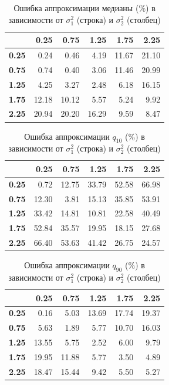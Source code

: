 \documentclass[12pt]{article}
\begin{document}
	\begin{table}[!hhh]
		\centering
		\caption{Ошибка аппроксимации медианы ($\%$) в зависимости от $\sigma_{1}^{2}$ (строка) и $\sigma_{2}^{2}$ (столбец)}
		\label{tab1}
		\begin{tabular}{rrrrrr}
			\hline
			& \textbf{0.25} & \textbf{0.75} & \textbf{1.25} & \textbf{1.75} & \textbf{2.25} \\ 
			\hline
			\textbf{0.25} & 0.24 & 0.46 & 4.19 & 11.67 & 21.10 \\ 
			\textbf{0.75} & 0.74 & 0.40 & 3.06 & 11.46 & 20.99 \\ 
			\textbf{1.25} & 4.25 & 3.27 & 2.48 & 6.18 & 16.15 \\ 
			\textbf{1.75} & 12.18 & 10.12 & 5.57 & 5.24 & 9.92 \\ 
			\textbf{2.25} & 20.94 & 20.20 & 16.29 & 9.59 & 8.47 \\ 
			\hline
		\end{tabular}
	\end{table}

\begin{table}[!hhh]
	\centering
	\caption{Ошибка аппроксимации $q_{10}$ ($\%$) в зависимости от $\sigma_{1}^{2}$ (строка) и $\sigma_{2}^{2}$ (столбец)}
	\label{tab2}
	\begin{tabular}{rrrrrr}
		\hline
		& \textbf{0.25} & \textbf{0.75} & \textbf{1.25} & \textbf{1.75} & \textbf{2.25} \\ 
		\hline
		\textbf{0.25} & 0.72 & 12.75 & 33.79 & 52.58 & 66.98 \\ 
		\textbf{0.75} & 12.30 & 3.81 & 15.13 & 35.85 & 53.91 \\ 
		\textbf{1.25} & 33.42 & 14.81 & 10.81 & 22.58 & 40.49 \\ 
		\textbf{1.75} & 52.84 & 35.57 & 19.95 & 18.15 & 27.68 \\ 
		\textbf{2.25} & 66.40 & 53.63 & 41.42 & 26.75 & 24.57 \\ 
		\hline
	\end{tabular}
\end{table}

\begin{table}[!hhh]
	\centering
	\caption{Ошибка аппроксимации $q_{90}$ ($\%$) в зависимости от $\sigma_{1}^{2}$ (строка) и $\sigma_{2}^{2}$ (столбец)}
	\label{tab3}
	\begin{tabular}{rrrrrr}
		\hline
		& \textbf{0.25} & \textbf{0.75} & \textbf{1.25} & \textbf{1.75} & \textbf{2.25} \\ 
		\hline
		\textbf{0.25} & 0.16 & 5.03 & 13.69 & 17.74 & 19.37 \\ 
		\textbf{0.75} & 5.63 & 1.89 & 5.77 & 10.70 & 16.03 \\ 
		\textbf{1.25} & 13.55 & 5.75 & 2.52 & 6.00 & 9.79 \\ 
		\textbf{1.75} & 19.95 & 11.88 & 5.77 & 3.50 & 4.89 \\ 
		\textbf{2.25} & 18.47 & 15.44 & 9.42 & 5.50 & 5.27 \\ 
		\hline
	\end{tabular}
\end{table}
	
\end{document}

